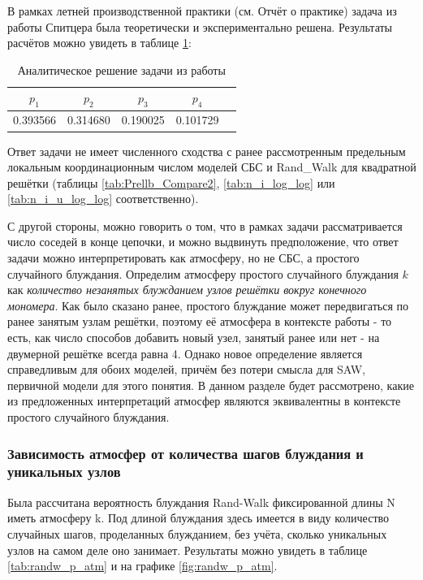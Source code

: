 В рамках летней производственной практики (см. Отчёт о практике) задача из работы Спитцера была теоретически и экспериментально решена. 
Результаты расчётов можно увидеть в таблице \ref{tab:Spitser_res}:

\begin{table}[h]
	\centering
	\begin{tabular}{|c|c|c|c|c|}
	\hline
	$p_1$ &  $p_2$ & $p_3$ &  $p_4$ \\ \hline
 	0.393566 & 0.314680 & 0.190025 & 0.101729 \\ \hline
	\end{tabular}
	\caption{Аналитическое решение задачи из работы  \cite{Spitser1969}}
	\label{tab:Spitser_res}
\end{table}

Ответ задачи не имеет численного сходства с ранее рассмотренным предельным локальным координационным числом моделей СБС и Rand\_Walk для квадратной решётки (таблицы \ref{tab:Prellb_Compare2}, \ref{tab:n_i_log_log} или \ref{tab:n_i_u_log_log} соответственно).

С другой стороны, можно говорить о том, что в рамках задачи рассматривается число соседей в конце цепочки, и можно выдвинуть предположение,
что ответ задачи можно интерпретировать как атмосферу, но не СБС, а простого случайного блуждания. 
Определим атмосферу простого случайного блуждания $k$ как \textit{количество незанятых блужданием узлов решётки вокруг конечного мономера}.
Как было сказано ранее, простого блуждание может передвигаться по ранее занятым узлам решётки, поэтому её атмосфера в контексте работы \cite{owczarek2008scaling}
 - то есть, как число способов добавить новый узел, занятый ранее или нет - на двумерной решётке всегда равна 4. 
Однако новое определение является справедливым для обоих моделей, причём без потери смысла для SAW, первичной модели для этого понятия.
В данном разделе будет рассмотрено, какие из предложенных интерпретаций атмосфер являются эквивалентны в контексте простого случайного блуждания.

\subsubsection{Зависимость атмосфер от количества шагов блуждания и уникальных узлов}

Была рассчитана вероятность блуждания Rand-Walk фиксированной длины N иметь атмосферу k. 
Под длиной блуждания здесь имеется в виду количество случайных шагов, проделанных блужданием, без учёта, сколько уникальных узлов на самом деле оно занимает.
Результаты можно увидеть в таблице \ref{tab:randw_p_atm} и на графике \ref{fig:randw_p_atm}.

